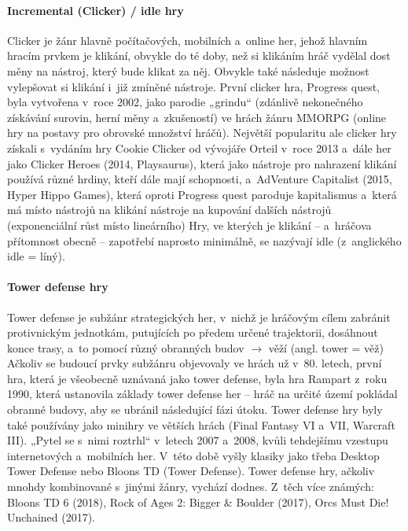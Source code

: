 \documentclass[a4paper]{extarticle}
\begin{document}
\paragraph{Incremental (Clicker) / idle hry}
Clicker je žánr hlavně počítačových, mobilních a~online her, jehož hlavním hracím prvkem je klikání, obvykle do té doby, než si klikáním hráč vydělal dost měny na nástroj, který bude klikat za něj. \cite{idle_games} Obvykle také následuje možnost vylepšovat si klikání i~již zmíněné nástroje.
První clicker hra, Progress quest, \cite{idle_games} byla vytvořena v~roce 2002, jako parodie „grindu“ (zdánlivě nekonečného získávání surovin, herní měny a~zkušeností) ve hrách žánru MMORPG (online hry na postavy pro obrovské množství hráčů). Největší popularitu ale clicker hry získali s~vydáním hry Cookie Clicker od vývojáře Orteil v~roce 2013 a~dále her jako Clicker Heroes (2014, Playsaurus), která jako nástroje pro nahrazení klikání používá různé hrdiny, kteří dále mají schopnosti, a~AdVenture Capitalist (2015, Hyper Hippo Games), která oproti Progress quest paroduje kapitalismus a~která má místo nástrojů na klikání nástroje na kupování dalších nástrojů (exponenciální růst místo lineárního)
Hry, ve kterých je klikání – a~hráčova přítomnost obecně – zapotřebí naprosto minimálně, se nazývají idle (z~anglického idle = líný). 
\paragraph{Tower defense hry}
Tower defense je subžánr strategických her, v~nichž je hráčovým cílem zabránit protivnickým jednotkám, putujících po předem určené trajektorii, dosáhnout konce trasy, a~to pomocí různý obranných budov $\rightarrow$ věží (angl. tower = věž)
Ačkoliv se budoucí prvky subžánru objevovaly ve hrách už v~80. letech, první hra, která je všeobecně uznávaná jako tower defense, byla hra Rampart z~roku 1990, která ustanovila základy tower defense her – hráč na určité území pokládal obranné budovy, aby se ubránil následující fázi útoku. Tower defense hry byly také používány jako minihry ve větších hrách (Final Fantasy VI a~VII, Warcraft III). „Pytel se s~nimi roztrhl“ v~letech 2007 a~2008, kvůli tehdejšímu vzestupu internetových a~mobilních her. V~této době vyšly klasiky jako třeba Desktop Tower Defense nebo Bloons TD (Tower Defense).
Tower defense hry, ačkoliv mnohdy kombinované s~jinými žánry, vychází dodnes. Z~těch více známých: Bloons TD 6 (2018), Rock of Ages 2: Bigger \& Boulder (2017), Orcs Must Die! Unchained (2017).
\end{document}
